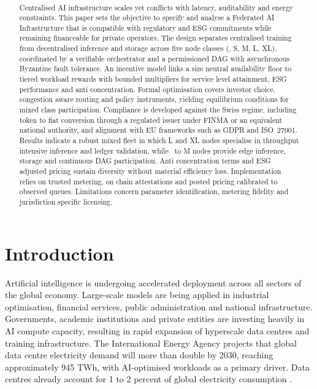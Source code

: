 \documentclass[oneside,10pt]{swissi}
\title{\papertitle \\[0.35em]
\normalsize \papersubtitle}
\author{{\fontsize{8}{10}\selectfont\paperauthors}\\[0.9em]
{\scriptsize\paperaffiliations}}
\date{\vspace{1.5em}}
\begin{document}
\maketitle

\begin{abstract}
Centralised AI infrastructure scales yet conflicts with latency, auditability and energy constraints. This paper sets the objective to specify and analyse a Federated AI Infrastructure that is compatible with regulatory and ESG commitments while remaining financeable for private operators. The design separates centralised training from decentralised inference and storage across five node classes (\textmu, S, M, L, XL), coordinated by a verifiable orchestrator and a permissioned DAG with asynchronous Byzantine fault tolerance. An incentive model links a size neutral availability floor to tiered workload rewards with bounded multipliers for service level attainment, ESG performance and anti concentration. Formal optimisation covers investor choice, congestion aware routing and policy instruments, yielding equilibrium conditions for mixed class participation. Compliance is developed against the Swiss regime, including token to fiat conversion through a regulated issuer under FINMA or an equivalent national authority, and alignment with EU frameworks such as GDPR and ISO~27001. Results indicate a robust mixed fleet in which L and XL nodes specialise in throughput intensive inference and ledger validation, while \textmu\ to M nodes provide edge inference, storage and continuous DAG participation. Anti concentration terms and ESG adjusted pricing sustain diversity without material efficiency loss. Implementation relies on trusted metering, on chain attestations and posted pricing calibrated to observed queues. Limitations concern parameter identification, metering fidelity and jurisdiction specific licensing.
\end{abstract}


\bigskip

\section{Introduction}

Artificial intelligence is undergoing accelerated deployment across all sectors of the global economy. Large-scale models are being applied in industrial optimisation, financial services, public administration and national infrastructure. Governments, academic institutions and private entities are investing heavily in AI compute capacity, resulting in rapid expansion of hyperscale data centres and training infrastructure. The International Energy Agency projects that global data centre electricity demand will more than double by 2030, reaching approximately 945 TWh, with AI-optimised workloads as a primary driver. Data centres already account for 1 to 2 percent of global electricity consumption \cite{iea2025}.
\end{document}
